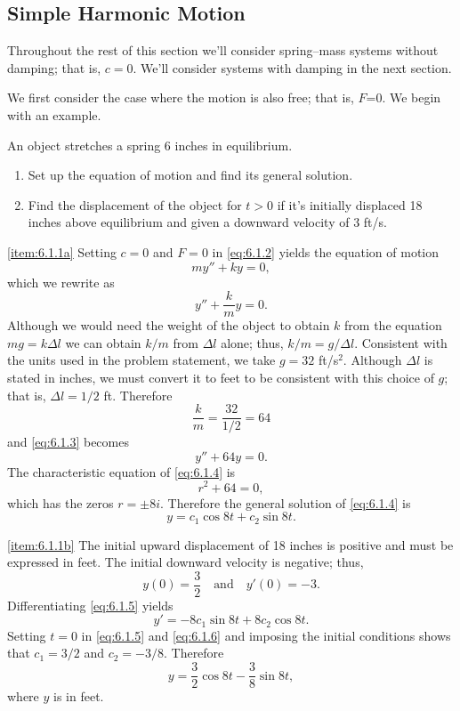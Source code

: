 \documentclass{ximera}
\begin{document}
 
\subsection*{Simple Harmonic Motion}
 
Throughout the rest of this section we'll consider spring--mass
systems without damping; that is, $c=0$. We'll consider systems with
damping in the next section.
 
We first consider the case where the motion is also free; that is,
$F$=0. We begin with an example.
 
\begin{example}\label{example:6.1.1}
An object stretches a spring 6 inches in equilibrium.
\begin{enumerate}
\item \label{item:6.1.1a} %
Set up the equation of motion and find its general solution.
 
\item \label{item:6.1.1b} %
Find the displacement of the object for $t>0$ if it's initially
displaced 18 inches above equilibrium and given a downward velocity of
3 ft/s.
\end{enumerate}
 
 
\begin{explanation}
\ref{item:6.1.1a}
Setting $c=0$ and $F=0$ in \eqref{eq:6.1.2} yields the equation of motion
$$
my''+ky=0,
$$
which we rewrite as
\begin{equation}\label{eq:6.1.3}
y''+\frac{k}{m}y=0.
\end{equation}
Although we would need the weight of the object to obtain $k$ from the
equation $mg=k\Delta l$ we can obtain $k/m$ from $\Delta l$ alone;
thus, $k/m=g/\Delta l$. Consistent with the units used in the problem
statement, we take $g=32$ ft/s$^2$. Although $\Delta l$ is stated in
inches, we must convert it to feet to be consistent with this choice
of $g$; that is, $\Delta l =1/2$ ft. Therefore
$$
\frac{k}{m}=\frac{32}{1/2}=64
$$
and \eqref{eq:6.1.3} becomes
\begin{equation}\label{eq:6.1.4}
y''+64y=0.
\end{equation}
 The characteristic equation of \eqref{eq:6.1.4} is
$$
r^2+64=0,
$$
which has the zeros $r=\pm 8i$. Therefore the general solution of
\eqref{eq:6.1.4} is
\begin{equation}\label{eq:6.1.5}
y=c_1\cos8t+c_2\sin8t.
\end{equation}
 
\ref{item:6.1.1b}
The initial upward displacement of 18 inches is positive and must be
expressed in feet. The initial downward velocity is negative;   thus,
$$
y(0)=\frac{3}{2}\quad\mbox{and}\quad y'(0)=-3.
$$
 Differentiating \eqref{eq:6.1.5} yields
\begin{equation}\label{eq:6.1.6}
y'=-8c_1\sin8t+8c_2\cos8t.
\end{equation}
Setting $t=0$ in \eqref{eq:6.1.5} and \eqref{eq:6.1.6} and imposing the
initial conditions shows that $c_1=3/2$ and $c_2=-3/8$. Therefore
$$
y=\frac{3}{2}\cos8t-\frac{3}{8}\sin8t,
$$
where $y$ is in feet.


\end{explanation}
\end{example}
\end{document}
